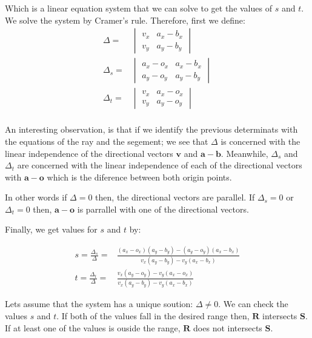 Which is a linear equation system that we can solve to get the values of $s$ and $t$.
We solve the system by Cramer's rule. 
Therefore, first we define:
\begin{align*}
\Delta =&  
\begin{vmatrix}
v_x & a_x - b_x \\
v_y & a_y - b_y
\end{vmatrix} \\
\Delta_s =&  
\begin{vmatrix}
a_x - o_x & a_x - b_x \\
a_y - o_y & a_y - b_y
\end{vmatrix} \\
\Delta_t =&  
\begin{vmatrix}
v_x & a_x - o_x \\
v_y & a_y - o_y
\end{vmatrix} \\
\end{align*}

An interesting observation, is that if we identify the previous determinats with the equations of the ray and the segement; 
we see that $\Delta$ is  concerned with the linear independence of the directional vectors $\mathbf{v}$ and $\mathbf{a} - \mathbf{b}$.
Meanwhile, $\Delta_s$ and $\Delta_t$ are concerned with the linear independence of each of the directional vectors with $\mathbf{a} - \mathbf{o}$ which is the diference between both origin points.

In other words if $\Delta = 0$ then, the directional vectors are parallel.
If $\Delta_s =  0$ or $\Delta_t = 0$ then, $\mathbf{a} - \mathbf{o}$ is parrallel with one of the directional vectors.

Finally, we get values for $s$ and $t$ by:

\begin{align*}
s = \frac{\Delta_s}{\Delta} =&  \frac{(a_x - o_x)(a_y - b_y) - (a_y - o_y)(a_x - b_x)}{v_x(a_y - b_y) - v_y(a_x - b_x)} \\
t = \frac{\Delta_t}{\Delta} =&  \frac{v_x(a_y - o_y) - v_y(a_x - o_x)}{v_x(a_y - b_y) - v_y(a_x - b_x)}
\end{align*}

Lets assume that the system has a unique soution: $\Delta \neq 0$. We can check the values $s$ and $t$. If both of the values fall in the desired range then, $\mathbf{R}$ intersects $\mathbf{S}$. If at least one of the values is ouside the range, $\mathbf{R}$ does not intersects $\mathbf{S}$.

